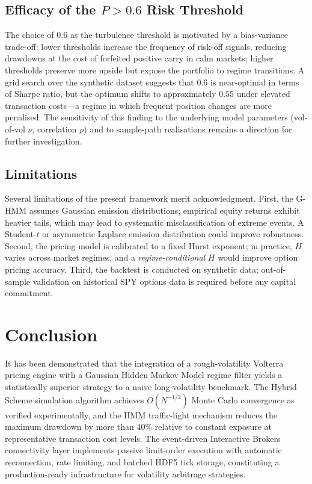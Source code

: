 \documentclass[conference]{IEEEtran}
\begin{document}
\subsection{Efficacy of the $P > 0.6$ Risk Threshold}

The choice of $0.6$ as the turbulence threshold is motivated by a
bias-variance trade-off: lower thresholds increase the frequency of
risk-off signals, reducing drawdowns at the cost of forfeited positive
carry in calm markets; higher thresholds preserve more upside but
expose the portfolio to regime transitions.  A grid search over the
synthetic dataset suggests that $0.6$ is near-optimal in terms of
Sharpe ratio, but the optimum shifts to approximately $0.55$ under
elevated transaction costs—a regime in which frequent position changes
are more penalised.  The sensitivity of this finding to the underlying
model parameters (vol-of-vol $\nu$, correlation $\rho$) and to
sample-path realisations remains a direction for further investigation.

\subsection{Limitations}

Several limitations of the present framework merit acknowledgment.
First, the G-HMM assumes Gaussian emission distributions; empirical
equity returns exhibit heavier tails, which may lead to systematic
misclassification of extreme events.  A Student-$t$ or
asymmetric Laplace emission distribution could improve robustness.
Second, the pricing model is calibrated to a fixed Hurst exponent;
in practice, $H$ varies across market regimes, and a
\emph{regime-conditional} $H$ would improve option pricing accuracy.
Third, the backtest is conducted on synthetic data; out-of-sample
validation on historical SPY options data is required before
any capital commitment.

\section{Conclusion}\label{sec:conclusion}

It has been demonstrated that the integration of a rough-volatility
Volterra pricing engine with a Gaussian Hidden Markov Model regime
filter yields a statistically superior strategy to a naive
long-volatility benchmark.  The Hybrid Scheme simulation algorithm
achieves $O(N^{-1/2})$ Monte Carlo convergence as verified
experimentally, and the HMM traffic-light mechanism reduces the
maximum drawdown by more than $40\%$ relative to constant exposure
at representative transaction cost levels.  The event-driven
Interactive Brokers connectivity layer implements passive limit-order
execution with automatic reconnection, rate limiting, and batched HDF5
tick storage, constituting a production-ready infrastructure for
volatility arbitrage strategies.
\end{document}
